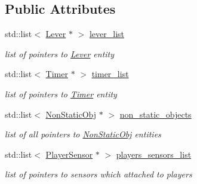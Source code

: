 \subsection*{Public Attributes}
\begin{DoxyCompactItemize}
\item 
\mbox{\label{class_storage_a183e52c6e96e3174e51b6ae47579ed55}} 
std\+::list$<$ \hyperlink{class_lever}{Lever} $\ast$ $>$ \hyperlink{class_storage_a183e52c6e96e3174e51b6ae47579ed55}{lever\+\_\+list}
\begin{DoxyCompactList}\small\item\em list of pointers to \hyperlink{class_lever}{Lever} entity \end{DoxyCompactList}\item 
\mbox{\label{class_storage_a9d200f7ba37543482bd1a50a54063ace}} 
std\+::list$<$ \hyperlink{class_timer}{Timer} $\ast$ $>$ \hyperlink{class_storage_a9d200f7ba37543482bd1a50a54063ace}{timer\+\_\+list}
\begin{DoxyCompactList}\small\item\em list of pointers to \hyperlink{class_timer}{Timer} entity \end{DoxyCompactList}\item 
\mbox{\label{class_storage_af0e098198f6896d667ce135b5d81b7c1}} 
std\+::list$<$ \hyperlink{class_non_static_obj}{Non\+Static\+Obj} $\ast$ $>$ \hyperlink{class_storage_af0e098198f6896d667ce135b5d81b7c1}{non\+\_\+static\+\_\+objects}
\begin{DoxyCompactList}\small\item\em list of all pointers to \hyperlink{class_non_static_obj}{Non\+Static\+Obj} entities \end{DoxyCompactList}\item 
\mbox{\label{class_storage_a9003cf58d8b5c48ca1ac7d0ce7323238}} 
std\+::list$<$ \hyperlink{class_player_sensor}{Player\+Sensor} $\ast$ $>$ \hyperlink{class_storage_a9003cf58d8b5c48ca1ac7d0ce7323238}{players\+\_\+sensors\+\_\+list}
\begin{DoxyCompactList}\small\item\em list of pointers to sensors which attached to players \end{DoxyCompactList}\item 
\mbox{\label{class_storage_ad96cf086d9e0eb5b811504d26737f351}} 

\end{DoxyCompactItemize}
